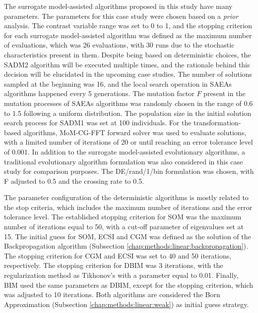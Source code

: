 			The surrogate model-assisted algorithms proposed in this study have many parameters. The parameters for this case study were chosen based on a \textit{prior} analysis. The contrast variable range was set to 0 to 1, and the stopping criterion for each surrogate model-assisted algorithm was defined as the maximum number of evaluations, which was 26 evaluations, with 30 runs due to the stochastic characteristics present in them. Despite being based on deterministic choices, the SADM2 algorithm will be executed multiple times, and the rationale behind this decision will be elucidated in the upcoming case studies. The number of solutions sampled at the beginning was 16, and the local search operation in SAEAs algorithms happened every 5 generations. The mutation factor $F$ present in the mutation processes of SAEAs algorithms was randomly chosen in the range of 0.6 to 1.5 following a uniform distribution. The population size in the initial solution search process for SADM1 was set at 100 individuals. For the transformation-based algorithms, MoM-CG-FFT forward solver was used to evaluate solutions, with a limited number of iterations of 20 or until reaching an error tolerance level of 0.001. In addition to the surrogate model-assisted evolutionary algorithms, a traditional evolutionary algorithm formulation was also considered in this case study for comparison purposes. The DE/rand/1/bin formulation was chosen, with F adjusted to 0.5 and the crossing rate to 0.5.
			
			The parameter configuration of the deterministic algorithms is mostly related to the stop criteria, which includes the maximum number of iterations and the error tolerance level. The established stopping criterion for SOM was the maximum number of iterations equal to 50, with a cut-off parameter of eigenvalues set at 15. The initial guess for SOM, ECSI and CGM was defined as the solution of the Backpropagation algorithm (Subsection \ref{chap:methods:linear:backpropagation}). The stopping criterion for CGM and ECSI was set to 40 and 50 iterations, respectively. The stopping criterion for DBIM was 3 iterations, with the regularization method as Tikhonov's with a parameter equal to 0.01. Finally, BIM used the same parameters as DBIM, except for the stopping criterion, which was adjusted to 10 iterations. Both algorithms are considered the Born Approximation (Subsection \ref{chap:methods:linear:weak}) as initial guess strategy.
			
